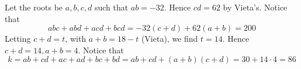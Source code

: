 Let the roots be $a,b,c,d$ such that $ab=-32$. Hence $cd=62$ by Vieta's.
Notice that
$$abc+abd+acd+bcd=-32(c+d)+62(a+b)=200$$
Letting $c+d=t$, with $a+b=18-t$ (Vieta), we find $t=14$. Hence $c+d=14, a+b=4$.
Notice that
$$k=ab+cd+ac+ad+bc+bd=ab+cd+(a+b)(c+d)=30+14\cdot 4=\boxed{86}$$
